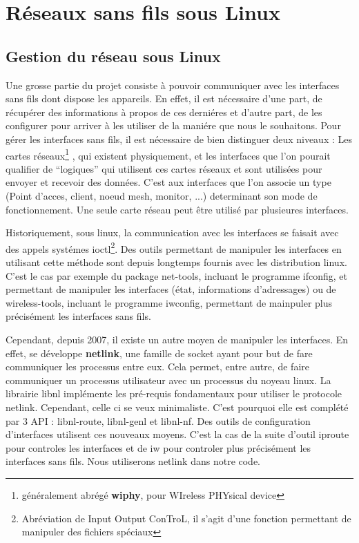 \chapter{Réseaux sans fils sous Linux}
\section{Gestion du réseau sous Linux}

Une grosse partie du projet consiste à pouvoir communiquer avec les interfaces sans fils dont dispose les appareils. En effet,
il est nécessaire d'une part, de récupérer des informations à propos de ces derniéres et d'autre part, de les configurer pour
arriver à les utiliser de la maniére que nous le souhaitons. Pour gérer les interfaces sans fils, il est nécessaire de bien
distinguer deux niveaux : Les cartes réseaux\footnote{généralement abrégé \textbf{wiphy}, pour WIreless PHYsical device} , 
qui existent physiquement, et les interfaces que l'on pourait qualifier de ``logiques'' qui utilisent ces cartes réseaux et 
sont utilisées pour envoyer et recevoir des données. C'est aux interfaces que l'on associe un type (Point d'acces, client,
noeud mesh, monitor, ...) determinant son mode de fonctionnement. Une seule carte réseau peut être utilisé par plusieures interfaces.

Historiquement, sous linux, la communication avec les interfaces se faisait avec des appels systémes ioctl\footnote{Abréviation
de Input Output ConTroL, il s'agit d'une fonction permettant de manipuler des fichiers spéciaux}. Des outils permettant de
manipuler les interfaces en utilisant cette méthode sont depuis longtemps fournis avec les distribution linux. C'est le cas par
exemple du package net-tools, incluant le programme ifconfig, et permettant de manipuler les interfaces (état, informations
d'adressages) ou de wireless-tools, incluant le programme iwconfig, permettant de mainpuler plus précisément les interfaces 
sans fils.

Cependant, depuis 2007, il existe un autre moyen de manipuler les interfaces. En effet, se développe \textbf{netlink}, une
famille de socket ayant pour but de fare communiquer les processus entre eux. Cela permet, entre autre, de faire communiquer
un processus utilisateur avec un processus du noyeau linux. La librairie libnl implémente les pré-requis fondamentaux pour 
utiliser le protocole netlink. Cependant, celle ci se veux minimaliste. C'est pourquoi elle est complété par 3 API : libnl-route,
libnl-genl et libnl-nf\cite{NLlibs}. Des outils de configuration d'interfaces utilisent ces nouveaux moyens. C'est la cas de 
la suite d'outil iproute pour controles les interfaces et de iw pour controler plus précisément les interfaces sans fils. Nous 
utiliserons netlink dans notre code.

